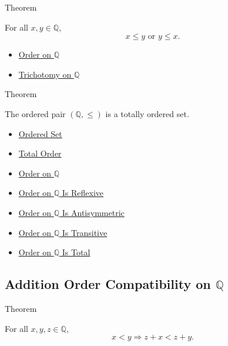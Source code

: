 \begin{theorembox}{Theorem}
\begin{theorem}
\label{thm:order-on-q-total}
For all $x,y\in\mathbb{Q}$,
\[
x\le y\text{ or }y\le x.
\]
\end{theorem}
\end{theorembox}

\begin{dependencies}
\begin{itemize}
  \item \hyperref[def:order-on-q]{Order on $\mathbb{Q}$}
  \item \hyperref[thm:trichotomy-on-q]{Trichotomy on $\mathbb{Q}$}
\end{itemize}
\end{dependencies}

\begin{theorembox}{Theorem}
\begin{theorem}
\label{thm:q-totally-ordered-set}
The ordered pair $(\mathbb{Q},\le)$ is a totally ordered set.
\end{theorem}
\end{theorembox}

\begin{dependencies}
\begin{itemize}
  \item \hyperref[def:ordered-set]{Ordered Set}
  \item \hyperref[def:total-order]{Total Order}
  \item \hyperref[def:order-on-q]{Order on $\mathbb{Q}$}
  \item \hyperref[thm:order-on-q-reflexive]{Order on $\mathbb{Q}$ Is Reflexive}
  \item \hyperref[thm:order-on-q-antisymmetric]{Order on $\mathbb{Q}$ Is Antisymmetric}
  \item \hyperref[thm:order-on-q-transitive]{Order on $\mathbb{Q}$ Is Transitive}
  \item \hyperref[thm:order-on-q-total]{Order on $\mathbb{Q}$ Is Total}
\end{itemize}
\end{dependencies}

\subsection*{Addition Order Compatibility on $\mathbb{Q}$}

\begin{theorembox}{Theorem}
\begin{theorem}
\label{thm:left-addition-preserves-strict-order-on-q}
For all $x,y,z\in\mathbb{Q}$,
\[
x<y \Longrightarrow z+x<z+y.
\]
\end{theorem}
\end{theorembox}

